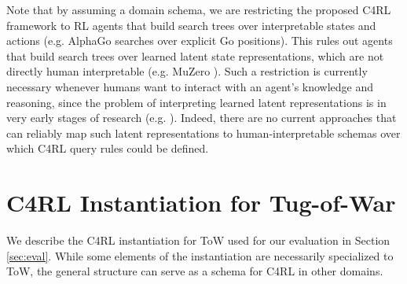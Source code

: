 \documentclass[letterpaper]{article} %
\begin{document}
Note that by assuming a domain schema, we are restricting the proposed C4RL framework to RL agents that build search trees over interpretable states and actions (e.g. AlphaGo searches over explicit Go positions). This rules out agents that build search trees over learned latent state representations, which are not directly human interpretable (e.g. MuZero \cite{schrittwieser2020}). Such a restriction is currently necessary whenever humans want to interact with an agent's knowledge and reasoning, since the problem of interpreting learned latent representations is in very early stages of research (e.g. \cite{voskuil2021}). Indeed, there are no current approaches that can reliably map such latent representations to human-interpretable schemas over which C4RL query rules could be defined.  




\section{C4RL Instantiation for Tug-of-War}
\label{sec:interface}

We describe the C4RL instantiation for ToW used for our evaluation in Section \ref{sec:eval}. While some elements of the instantiation
are necessarily specialized to ToW, the general structure can serve as a schema for C4RL in other domains. 
\end{document}
